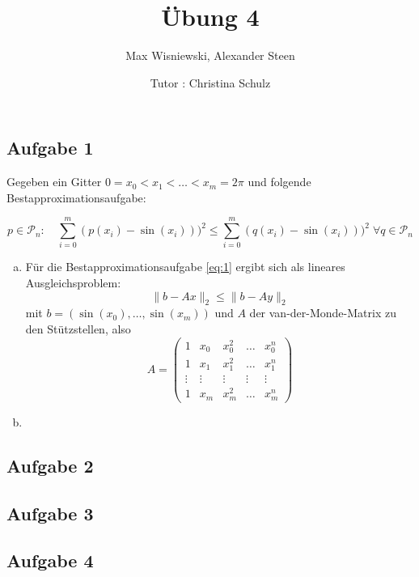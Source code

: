 \documentclass[11pt,a4paper,ngerman]{article}
\date{Tutor : Christina Schulz}
\title{Übung 4}
\author{Max Wisniewski, Alexander Steen}
\begin{document}

\renewcommand{\figurename}{Figure}

\maketitle
\thispagestyle{fancy}

\subsection*{Aufgabe 1}
Gegeben ein Gitter $0 = x_0 < x_1 < \ldots < x_m = 2 \pi$ und folgende Bestapproximationsaufgabe:

\begin{equation} \label{eq:1}
 p \in \mathcal{P}_n: \quad \sum_{i=0}^m {\left(p(x_i) - \sin(x_i) \right))^2} \leq \sum_{i=0}^m {\left(q(x_i) - \sin(x_i) \right))^2} \; \forall q \in \mathcal{P}_n
\end{equation}

\begin{enumerate}[a)]
\item Für die Bestapproximationsaufgabe \ref{eq:1} ergibt sich als lineares Ausgleichsproblem:
\begin{equation}
\|b - Ax \|_2 \leq \|b - Ay \|_2
\end{equation}
mit $b = \left(\sin(x_0),\ldots,\sin(x_m) \right)$ und $A$ der van-der-Monde-Matrix zu den Stützstellen, also
$$ A = \left( \begin{array}{ccccc} 1 & x_0 & x_0^2 & \ldots & x_0^n \\
  1 & x_1 & x_1^2 & \ldots & x_1^n \\
  \vdots & \vdots & \vdots &\vdots & \vdots \\
  1 & x_m & x_m^2 & \ldots & x_m^n \end{array} \right)$$
\item 
\end{enumerate}
\subsection*{Aufgabe 2}

\subsection*{Aufgabe 3}

\subsection*{Aufgabe 4}



\label{LastPage}
\end{document}
